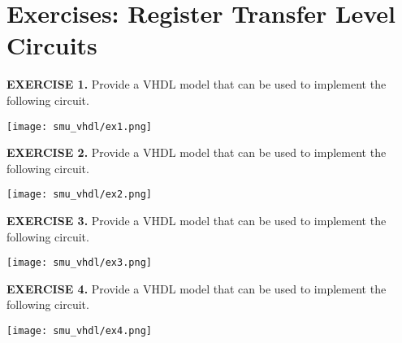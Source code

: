 \section{Exercises: Register Transfer Level Circuits}

\vspace{20pt}
\noindent
\begin{minipage}[t]{0.5\textwidth}
\textbf{EXERCISE 1.}
Provide a VHDL model that can be used to implement the following circuit.
\end{minipage}
\begin{minipage}[t]{0.47\textwidth}
\vspace{0pt}\raggedright
\centering
\texttt{[image: smu\_vhdl/ex1.png]}
\end{minipage}

\vspace{20pt}
\noindent
\begin{minipage}[t]{0.5\textwidth}
\textbf{EXERCISE 2.}
Provide a VHDL model that can be used to implement the following circuit.
\end{minipage}
\begin{minipage}[t]{0.47\textwidth}
\vspace{0pt}\raggedright
\centering
\texttt{[image: smu\_vhdl/ex2.png]}
\end{minipage}

\vspace{20pt}
\noindent
\begin{minipage}[t]{0.5\textwidth}
\textbf{EXERCISE 3.}
Provide a VHDL model that can be used to implement the following circuit. 
\end{minipage}
\begin{minipage}[t]{0.47\textwidth}
\vspace{0pt}\raggedright
\centering
\texttt{[image: smu\_vhdl/ex3.png]}
\end{minipage}

\vspace{20pt}
\noindent
\begin{minipage}[t]{0.5\textwidth}
\textbf{EXERCISE 4.}
Provide a VHDL model that can be used to implement the following circuit.
\end{minipage}
\begin{minipage}[t]{0.47\textwidth}
\vspace{0pt}\raggedright
\centering
\texttt{[image: smu\_vhdl/ex4.png]}
\end{minipage}

